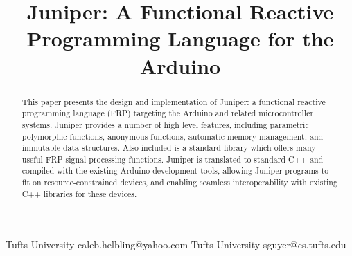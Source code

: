 \documentclass{sigplanconf}
\begin{document}
\setlength{\pdfpageheight}{\paperheight}
\setlength{\pdfpagewidth}{\paperwidth}




\permissiontopublish             %


\title{Juniper: A Functional Reactive Programming Language for the Arduino}

           {Tufts University}
           {caleb.helbling@yahoo.com}
           {Tufts University}
           {sguyer@cs.tufts.edu}

\maketitle

\begin{abstract}
This paper presents the design and implementation of Juniper: a functional reactive programming language (FRP) targeting the Arduino and related microcontroller systems. Juniper provides a number of high level features, including parametric polymorphic functions, anonymous functions, automatic memory management, and immutable data structures. Also included is a standard library which offers many useful FRP signal processing functions. Juniper is translated to standard C++ and compiled with the existing Arduino development tools, allowing Juniper programs to fit on resource-constrained devices, and enabling seamless interoperability with existing C++ libraries for these devices.
\end{abstract}

\end{document}

